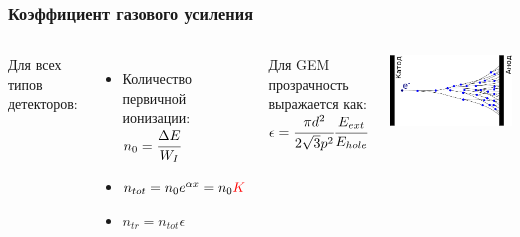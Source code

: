 \documentclass[14pt]{beamer}
\begin{document}
\begin{frame}[t]
\frametitle{Коэффициент газового усиления}
\vspace{0pt}
\begin{columns}
\begin{minipage}[t][1\textheight]{\linewidth}
	\small{
		Для всех типов детекторов:
		\begin{itemize}
			\item Количество первичной ионизации: $n_{0} = \cfrac{\Delta E}{W_I}$
			\item $n_{tot} = n_{0} e^{\alpha x} = n_{0}\color{red}{K}$
			\item $\displaystyle n_{tr} = n_{tot} \epsilon$
		\end{itemize}
		Для GEM прозрачность выражается как: 
		$\epsilon = \cfrac{\pi d^2}{2\sqrt{3}p^2}\cfrac{E_{ext}}{E_{hole}}$}
\end{minipage}%
\begin{minipage}[t][1\textheight]{\linewidth}
	\vspace*{40pt}
	\center \includegraphics[width=0.9\linewidth]{Electron_avalanche.pdf}
\end{minipage}%
\end{columns}
\end{frame}
\end{document}

